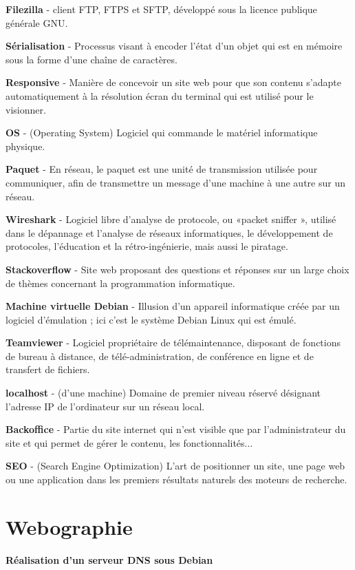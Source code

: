 \documentclass[report]{tnreport}
\begin{document}
\textbf{Filezilla} - client FTP, FTPS et SFTP, développé sous la licence publique générale GNU.

\textbf{Sérialisation} - Processus visant à encoder l'état d'un objet qui est en mémoire sous la forme d'une chaîne de caractères.

\textbf{Responsive} - Manière de concevoir un site web pour que son contenu s'adapte automatiquement à la résolution écran du terminal qui est utilisé pour le visionner. 

\textbf{OS} - (Operating System) Logiciel qui commande le matériel informatique physique. 

\textbf{Paquet} - En réseau, le paquet est une unité de transmission utilisée pour communiquer, afin de transmettre un message d'une machine à une autre sur un réseau.

\textbf{Wireshark} - Logiciel libre d’analyse de protocole, ou «packet sniffer », utilisé dans le dépannage et l’analyse de réseaux informatiques, le développement de protocoles, l’éducation et la rétro-ingénierie, mais aussi le piratage.


\textbf{Stackoverflow} - Site web proposant des questions et réponses sur un large choix de thèmes concernant la programmation informatique.

\textbf{Machine virtuelle Debian} - Illusion d'un appareil informatique créée par un logiciel d'émulation ; ici c'est le système Debian Linux qui est émulé.

\textbf{Teamviewer} - Logiciel propriétaire de télémaintenance, disposant de fonctions de bureau à distance, de télé-administration, de conférence en ligne et de transfert de fichiers.

\textbf{localhost} - (d'une machine) Domaine de premier niveau réservé désignant l'adresse IP de l'ordinateur sur un réseau local.

\textbf{Backoffice} - Partie du site internet qui n'est visible que par l'administrateur du site et qui permet de gérer le contenu, les fonctionnalités... 

\textbf{SEO} - (Search Engine Optimization)  L'art de positionner un site, une page web ou une application dans les premiers résultats naturels des moteurs de recherche.


\chapter*{Webographie}

\textbf{Réalisation d'un serveur DNS sous Debian}
\end{document}
